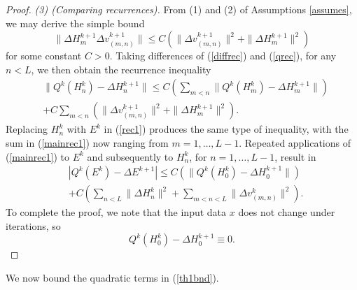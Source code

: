 \documentclass{jcmlatex}
\begin{document}
\begin{proof}
\textit{(3) (Comparing recurrences).}
From (1) and (2) of Assumptions \ref{assumes}, we may derive the simple bound
\begin{equation}
\|\Delta H_m^{k+1}\Delta v_{(m,n)}^{k+1}\| \le C( \|\Delta v_{(m,n)}^{k+1}\|^2+\|\Delta
H_m^{k+1}\|^2)
\end{equation}
for some constant $C>0$. 
Taking differences of (\ref{diffrec}) and (\ref{qrec}),
for any $n<L$,  we then obtain the recurrence inequality
\begin{align}
&\|Q^k(H_n^{k})-\Delta H_n^{k+1} \|\le C\left(\sum_{m < n}\|Q^k(
H_m^{k})-\Delta H_m^{k+1} \|  \right)  \label{rec1}\\&+ C\sum_{m<n} ( \|\Delta v_{(m,n)}^{k+1}\|^2+\|\Delta
H_m^{k+1}\|^2) \label{mainrec1}.
\end{align}
Replacing $H_n^k$ with $E^k$ in (\ref{rec1}) produces the same type of inequality,
with the sum in (\ref{mainrec1}) now ranging from $m = 1, \dots, L-1$. Repeated
applications of (\ref{mainrec1}) to  $E^k$ and subsequently to $H_n^k$,
for $n = 1, \dots, L-1$, result in   
\begin{align}
&|Q^k(E^k)-\Delta E^{k+1}|\le C\left(\|Q^k( H_0^{k})-\Delta H_0^{k+1} \|  \right)
\\&+ C\left(\sum_{n< L}\|\Delta H_n^k\|^2 + \sum_{m<n< L}\|\Delta v_{(m,n)}^k\|^2\right)
\label{mainrec}.
\end{align}
To complete the proof, we note that
 the input data $x$ does not change under iterations, so \begin{equation}
Q^k( H_0^{k})-\Delta H_0^{k+1} \equiv 0.
\end{equation}
\end{proof} We now bound the quadratic terms in (\ref{th1bnd}).
\end{document}
